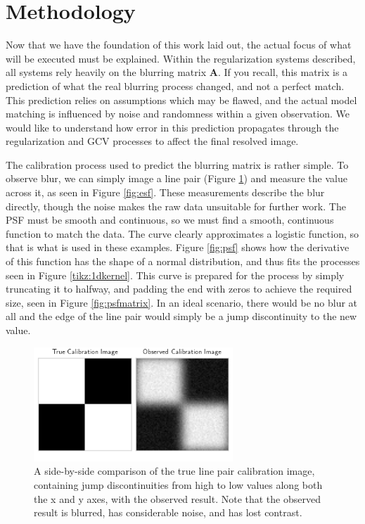 \documentclass[letterpaper, 10pt, titlepage, twocolumn]{article}
\begin{document}
\section*{Methodology}
Now that we have the foundation of this work laid out, the actual focus of what will be executed must be explained. Within the regularization systems described, all systems rely heavily on the blurring matrix \textbf{A}. If you recall, this matrix is a prediction of what the real blurring process changed, and not a perfect match. This prediction relies on assumptions which may be flawed, and the actual model matching is influenced by noise and randomness within a given observation. We would like to understand how error in this prediction propagates through the regularization and GCV processes to affect the final resolved image.

The calibration process used to predict the blurring matrix is rather simple. To observe blur, we can simply image a line pair (Figure \ref{fig:linepairs}) and measure the value across it, as seen in Figure \ref{fig:esf}. These measurements describe the blur directly, though the noise makes the raw data unsuitable for further work. The PSF must be smooth and continuous, so we must find a smooth, continuous function to match the data. The curve clearly approximates a logistic function, so that is what is used in these examples. Figure \ref{fig:psf} shows how the derivative of this function has the shape of a normal distribution, and thus fits the processes seen in Figure \ref{tikz:1dkernel}. This curve is prepared for the process by simply truncating it to halfway, and padding the end with zeros to achieve the required size, seen in Figure \ref{fig:psfmatrix}. In an ideal scenario, there would be no blur at all and the edge of the line pair would simply be a jump discontinuity to the new value.

\begin{figure}[H]
  \centering
  \includegraphics[width=7.5cm]{imgcompare.png}
  \caption{A side-by-side comparison of the true line pair calibration image, containing jump discontinuities from high to low values along both the x and y axes, with the observed result. Note that the observed result is blurred, has considerable noise, and has lost contrast.}
  \label{fig:linepairs}
\end{figure}
\end{document}
